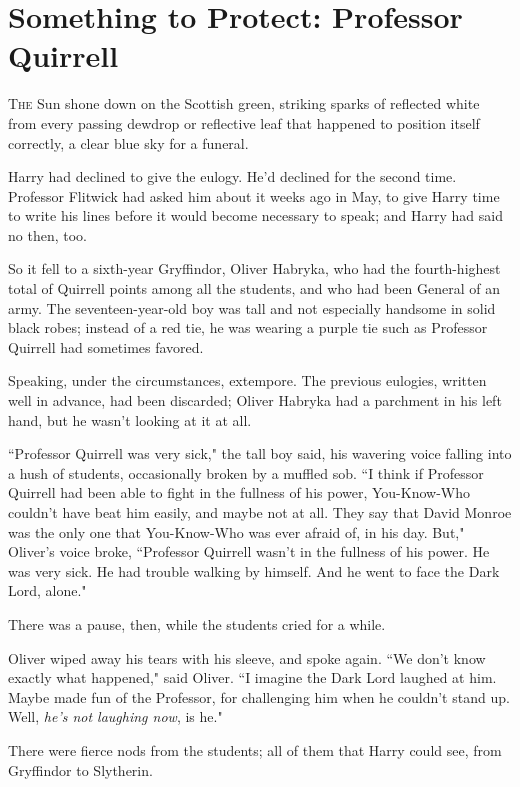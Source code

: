\chapter{Something to Protect: Professor Quirrell}

\lettrine{T}{he} Sun shone down on the Scottish green, striking sparks of reflected white from every passing dewdrop or reflective leaf that happened to position itself correctly, a clear blue sky for a funeral.

Harry had declined to give the eulogy. He'd declined for the second time. Professor Flitwick had asked him about it weeks ago in May, to give Harry time to write his lines before it would become necessary to speak; and Harry had said no then, too.

So it fell to a sixth-year Gryffindor, Oliver Habryka, who had the fourth-highest total of Quirrell points among all the students, and who had been General of an army. The seventeen-year-old boy was tall and not especially handsome in solid black robes; instead of a red tie, he was wearing a purple tie such as Professor Quirrell had sometimes favored.

Speaking, under the circumstances, extempore. The previous eulogies, written well in advance, had been discarded; Oliver Habryka had a parchment in his left hand, but he wasn't looking at it at all.

``Professor Quirrell was very sick," the tall boy said, his wavering voice falling into a hush of students, occasionally broken by a muffled sob. ``I think if Professor Quirrell had been able to fight in the fullness of his power, You-Know-Who couldn't have beat him easily, and maybe not at all. They say that David Monroe was the only one that You-Know-Who was ever afraid of, in his day. But," Oliver's voice broke, ``Professor Quirrell wasn't in the fullness of his power. He was very sick. He had trouble walking by himself. And he went to face the Dark Lord, alone."

There was a pause, then, while the students cried for a while.

Oliver wiped away his tears with his sleeve, and spoke again. ``We don't know exactly what happened," said Oliver. ``I imagine the Dark Lord laughed at him. Maybe made fun of the Professor, for challenging him when he couldn't stand up. Well, \emph{he's not laughing now}, is he."

There were fierce nods from the students; all of them that Harry could see, from Gryffindor to Slytherin.

